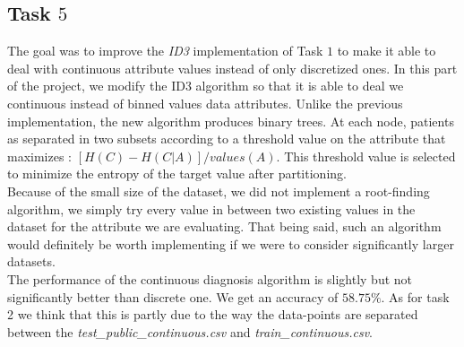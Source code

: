 \documentclass[8pt]{extarticle}
\begin{document}
\subsection{Task $5$}
The goal was to improve the \emph{ID3} implementation of Task $1$ to make it able to deal with continuous attribute values instead of only discretized ones.
In this part of the project, we modify the ID3 algorithm so that it is able to deal we continuous instead of binned values data attributes. Unlike the previous implementation, the new algorithm produces binary trees. At each node, patients as separated in two subsets according to a threshold value on the attribute that maximizes : $[H(C) - H(C|A)] / {values(A)}$. This threshold value is selected to minimize the entropy of the target value after partitioning. \\
Because of the small size of the dataset, we did not implement a root-finding algorithm, we simply try every value in between two existing values in the dataset for the attribute we are evaluating. That being said, such an algorithm would definitely be worth implementing if we were to consider significantly larger datasets. \\
The performance of the continuous diagnosis algorithm is slightly but not significantly better than discrete one. We get an accuracy of $58.75\%$. As for task 2 we think that this is partly due to the way the data-points are separated between the \emph{test\_public\_continuous.csv} and \emph{train\_continuous.csv}. 
\end{document}

